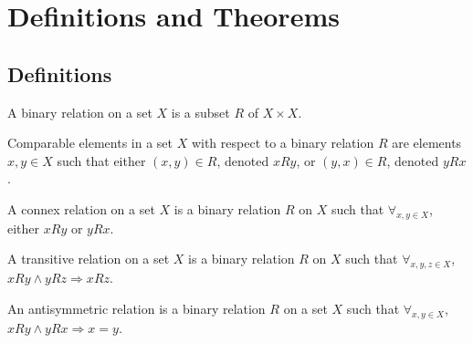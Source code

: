     \section{Definitions and Theorems}
        \subsection{Definitions}
            \begin{definition}
                \label{%
                    Definition:MathEnc:Analysis:%
                    Sum:BinaryRelation%
                }
                A binary relation on a set $X$ is
                a subset $R$ of $X\times X$.
            \end{definition}
            \begin{definition}
                \label{%
                    Definition:MathEnc:Analysis:%
                    Sum:ComparableElements%
                }
                Comparable elements in a set $X$ with respect
                to a binary relation $R$
                are elements $x,y\in X$ such that either
                $(x,y)\in R$, denoted $xRy$,
                or $(y,x)\in R$, denoted $yRx$.
            \end{definition}
            \begin{definition}
                \label{%
                    Definition:MathEnc:Analysis:%
                    Sum:ConnexRelation%
                }
                A connex relation on a set $X$ is a
                binary relation $R$ on $X$ such that
                $\forall_{x,y\in X}$, either $xRy$ or $yRx$.
            \end{definition}
            \begin{definition}
                \label{%
                    Definition:MathEnc:Analysis:%
                    Sum:TransitiveRelation%
                }
                A transitive relation on a set $X$
                is a binary relation $R$ on $X$ such
                that $\forall_{x,y,z\in X}$,
                $xRy\land yRz\Rightarrow xRz$.
            \end{definition}
            \begin{definition}
                \label{%
                    Definition:MathEnc:Analysis:%
                    Sum:AntisymmetricRelation%
                }
                An antisymmetric relation is a binary relation
                $R$ on a set $X$ such that
                $\forall_{x,y\in X}$, $xRy\land yRx\Rightarrow x=y$.
            \end{definition}
